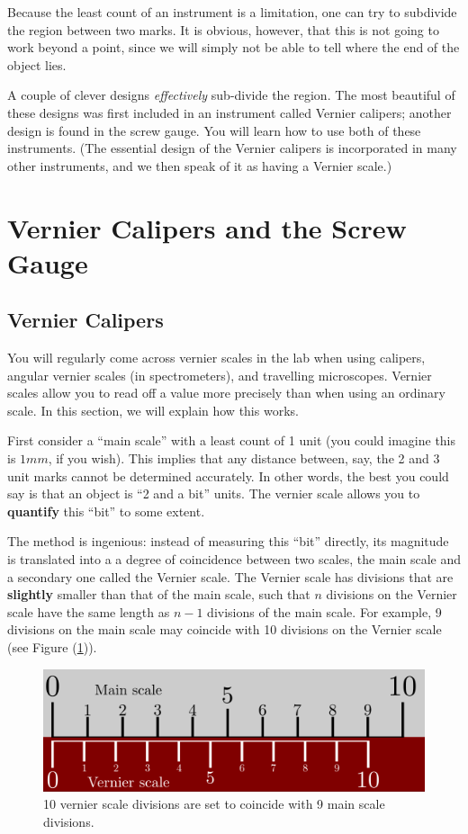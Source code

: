 Because the least count of an instrument is a limitation, one can try to subdivide the region between two marks. It is obvious, however, that this is not going to work beyond a point, since we will simply not be able to tell where the end of the object lies. 

A couple of clever designs \textit{effectively} sub-divide the region. The most beautiful of these designs was first included in an instrument called Vernier calipers; another design is found in the screw gauge. You will learn how to use both of these instruments. (The essential design of the Vernier calipers is incorporated in many other instruments, and we then speak of it as having a Vernier scale.)

\section{Vernier Calipers and the Screw Gauge}

\subsection{Vernier Calipers}

You will regularly come across vernier scales in the lab when using calipers, angular vernier scales (in spectrometers), and travelling microscopes. Vernier scales allow you to read off a value more precisely than when using an ordinary scale. In this section, we will explain how this works.

First consider a ``main scale'' with a least count of 1 unit (you could imagine this is $1mm$, if you wish). This implies that any distance between, say, the 2 and 3 unit marks cannot be determined accurately. In other words, the best you could say is that an object is ``2 and a bit'' units. The vernier scale allows you to \textbf{quantify} this ``bit'' to some extent.  

The method is ingenious: instead of measuring this ``bit'' directly, its magnitude is translated into a a degree of coincidence between two scales, the main scale and a secondary one called the Vernier scale. The Vernier scale has divisions that are \textbf{slightly} smaller than that of the main scale, such that $n$ divisions on the Vernier scale have the same length as $n-1$ divisions of the main scale. For example,  9 divisions on the main scale may coincide with 10 divisions on the Vernier scale (see Figure (\ref{fig:vernier_1})). 

\begin{figure}[!htb]
    \centering
    \includegraphics[scale=0.75]{figs/vernier1.png}
    \caption{10 vernier scale divisions are set to coincide with 9 main scale divisions.}
    \label{fig:vernier_1}
\end{figure}


